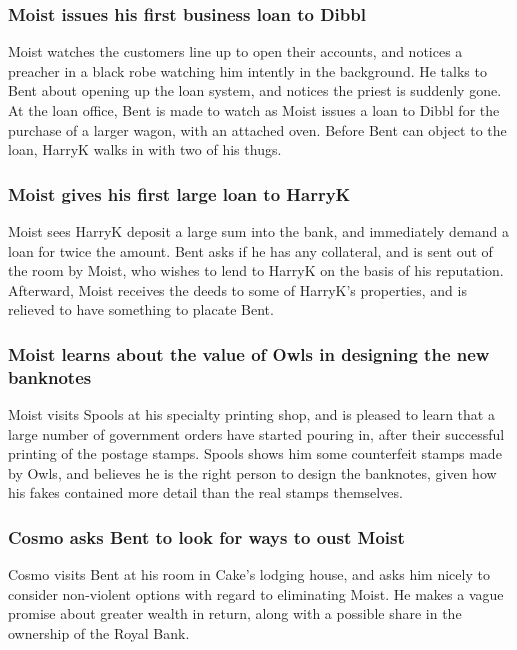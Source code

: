 \subsubsection{\Gls{Moist} issues his first business loan to \Gls{Dibbl}}
\Gls{Moist} watches the customers line up to open their accounts, and notices a preacher in a black
robe watching him intently in the background. He talks to \Gls{Bent} about opening up the loan
system, and notices the priest is suddenly gone. At the loan office, \Gls{Bent} is made to watch
as \Gls{Moist} issues a loan to \Gls{Dibbl} for the purchase of a larger wagon, with an attached
oven. Before \Gls{Bent} can object to the loan, \Gls{HarryK} walks in with two of his thugs.

\subsubsection{\Gls{Moist} gives his first large loan to \Gls{HarryK}}
\Gls{Moist} sees \Gls{HarryK} deposit a large sum into the bank, and immediately demand a loan for
twice the amount. \Gls{Bent} asks if he has any collateral, and is sent out of the room by
\Gls{Moist}, who wishes to lend to \Gls{HarryK} on the basis of his reputation. Afterward,
\Gls{Moist} receives the deeds to some of \Gls{HarryK}'s properties, and is relieved to have
something to placate \Gls{Bent}.

\subsubsection{\Gls{Moist} learns about the value of \Gls{Owls} in designing the new banknotes}
\Gls{Moist} visits \Gls{Spools} at his specialty printing shop, and is pleased to learn that a large
number of government orders have started pouring in, after their successful printing of the postage
stamps. \Gls{Spools} shows him some counterfeit stamps made by \Gls{Owls}, and believes he is the
right person to design the banknotes, given how his fakes contained more detail than the real stamps
themselves.

\subsubsection{\Gls{Cosmo} asks \Gls{Bent} to look for ways to oust \Gls{Moist}}
\Gls{Cosmo} visits \Gls{Bent} at his room in \Gls{Cake}'s lodging house, and asks him nicely to
consider non-violent options with regard to eliminating \Gls{Moist}. He makes a vague promise about
greater wealth in return, along with a possible share in the ownership of the Royal Bank.

